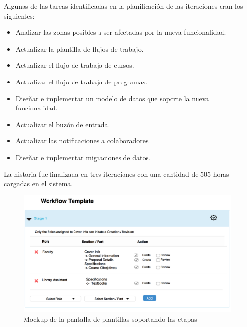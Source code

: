 Algunas de las tareas identificadas en la planificación de las iteraciones eran los siguientes:
\begin{itemize}
	\item Analizar las zonas posibles a ser afectadas por la nueva funcionalidad.
	\item Actualizar la plantilla de flujos de trabajo.
	\item Actualizar el flujo de trabajo de cursos.
	\item Actualizar el flujo de trabajo de programas.
	\item Diseñar e implementar un modelo de datos que soporte la nueva funcionalidad.
	\item Actualizar el buzón de entrada.
	\item Actualizar las notificaciones a colaboradores.
	\item Diseñar e implementar migraciones de datos.
\end{itemize}

La historia fue finalizada en tres iteraciones con una cantidad de 505 horas cargadas en el sistema.

\begin{figure}[H]
\centering
\includegraphics[width=125mm,scale=1]{Capitulos/DesarrollodelaAplicacion/Imagenes/workflow_stage}
\caption{Mockup de la pantalla de plantillas soportando las etapas.}
  \label{workflow_stage}
\end{figure}

